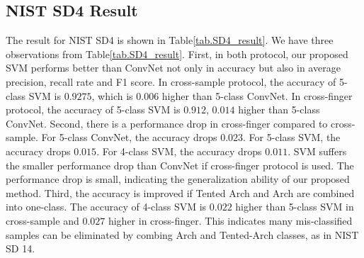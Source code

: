 \begin{table}[!ht]
	
	\centering
	\caption{ Experiment results for NIST SD14. In column 4, 5 and 6, we also report the average precision, recall and F1 score for all predicted classes. }
	\label{tab.SD14_result}
\end{table}

\subsection{NIST SD4 Result}

The result for NIST SD4 is shown in Table\ref{tab.SD4_result}.
%
We have three observations from Table\ref{tab.SD4_result}.
%
First, in both protocol, our proposed SVM performs better than ConvNet not only in accuracy but also in average precision, recall rate and F1 score. 
%
In cross-sample protocol, the accuracy of 5-class SVM is $0.9275$, which is $0.006$ higher than 5-class ConvNet. In cross-finger protocol, the accuracy of 5-class SVM is $0.912$, $0.014$ higher than 5-class ConvNet.
%
Second, there is a performance drop in cross-finger compared to cross-sample. For 5-class ConvNet, the accuracy drops $0.023$. For 5-class SVM, the accuracy drops $0.015$. For 4-class SVM, the accuracy drops $0.011$. 
%
SVM suffers the smaller performance drop than ConvNet if cross-finger protocol is used.
%
The performance drop is small, indicating the generalization ability of our proposed method.
%
Third, the accuracy is improved if Tented Arch and Arch are combined into one-class. The accuracy of 4-class SVM is $0.022$ higher than 5-class SVM in cross-sample and $0.027$ higher in cross-finger. This indicates many mis-classified samples can be eliminated by combing Arch and Tented-Arch classes, as in NIST SD 14.

